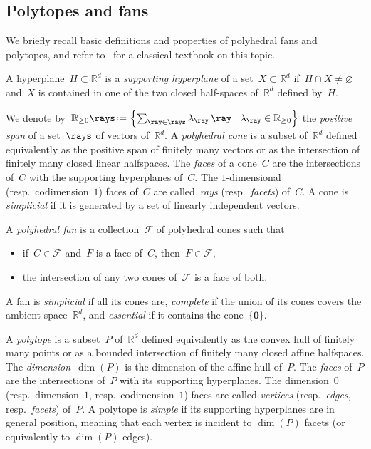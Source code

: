 \documentclass{amsart}
\theoremstyle{definition}
\newcommand{\R}{\mathbb{R}} %
\renewcommand{\b}[1]{{\boldsymbol{#1}}} %
\newcommand{\set}[2]{\left\{ #1 \;\middle|\; #2 \right\}} %
\newcommand{\eqdef}{\mbox{\,\raisebox{0.2ex}{\scriptsize\ensuremath{\mathrm:}}\ensuremath{=}\,}} %
\newcommand{\darkblue}{\color{darkblue}} %
\newcommand{\defn}[1]{\textsl{\darkblue #1}} %
\newcommand{\Fan}{\mathcal{F}} %
\begin{document}

\subsection{Polytopes and fans}

We briefly recall basic definitions and properties of polyhedral fans and polytopes, and refer to~\cite{Ziegler-polytopes} for a classical textbook on this topic.

A hyperplane~$H \subset \R^d$ is a \defn{supporting hyperplane} of a set~$X \subset \R^d$ if~$H \cap X \ne \varnothing$ and~$X$ is contained in one of the two closed half-spaces of~$\R^d$ defined by~$H$.

We denote by~$\R_{\ge0}\rays \eqdef \set{\sum_{\ray \in \rays} \lambda_{\ray} \, \ray}{\lambda_{\ray} \in \R_{\ge0}}$ the \defn{positive span} of a set~$\rays$ of vectors of~$\R^d$.
A \defn{polyhedral cone} is a subset of~$\R^d$ defined equivalently as the positive span of finitely many vectors or as the intersection of finitely many closed linear halfspaces.
The \defn{faces} of a cone~$C$ are the intersections of~$C$ with the supporting hyperplanes of~$C$.
The $1$-dimensional (resp.~codimension~$1$) faces of~$C$ are called~\defn{rays} (resp.~\defn{facets}) of~$C$.
A cone is \defn{simplicial} if it is generated by a set of linearly independent vectors.

A \defn{polyhedral fan} is a collection~$\Fan$ of polyhedral cones such that
\begin{itemize}
\item if~$C \in \Fan$ and~$F$ is a face of~$C$, then~$F \in \Fan$,
\item the intersection of any two cones of~$\Fan$ is a face of both.
\end{itemize}
A fan is \defn{simplicial} if all its cones are, \defn{complete} if the union of its cones covers the ambient space~$\R^d$, and \defn{essential} if it contains the cone~$\{\b{0}\}$.

A \defn{polytope} is a subset~$P$ of~$\R^d$ defined equivalently as the convex hull of finitely many points or as a bounded intersection of finitely many closed affine halfspaces.
The \defn{dimension}~$\dim(P)$ is the dimension of the affine hull of~$P$.
The \defn{faces} of~$P$ are the intersections of~$P$ with its supporting hyperplanes.
The dimension~$0$ (resp.~dimension~$1$, resp.~codimension~$1$) faces are called \defn{vertices} (resp.~\defn{edges}, resp.~\defn{facets}) of~$P$.
A polytope is \defn{simple} if its supporting hyperplanes are in general position, meaning that each vertex is incident to $\dim(P)$ facets (or equivalently to $\dim(P)$ edges).
\end{document}
